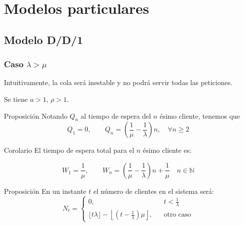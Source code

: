 \documentclass[8pt]{beamer}
\begin{document}
  
  
\section{Modelos particulares}

  \subsection{Modelo D/D/1}
  \begin{frame}\frametitle{Caso $\lambda > \mu$}
    Intuitivamente, la cola será inestable y no podrá servir todas las peticiones. 

    Se tiene $a > 1$, $\rho > 1$.

    \begin{block}{Proposición}
      Notando $Q_n$ al tiempo de espera del $n$ ésimo cliente, tenemos que \[Q_1 = 0, \qquad Q_n = \left(\frac{1}{\mu} - \frac{1}{\lambda}\right)n, \quad \forall n\ge 2\]
    \end{block}

    \begin{block}{Corolario}
      El tiempo de espera total para el $n$ ésimo cliente es:
 
      \[W_1 = \frac{1}{\mu}, \qquad W_n = \left(\frac{1}{\mu} - \frac{1}{\lambda}\right)n + \frac{1}{\mu} \quad n\in \mathbb{N}\]
    \end{block}

    \begin{block}{Proposición}
      En un instante $t$ el número de clientes en el sistema será: 
      \[N_t = \left\{\begin{array}{lcc}
      0, && t < \frac{1}{\lambda}\\
      \lfloor t\lambda \rfloor - \left\lfloor\left(t-\frac{1}{\lambda}\right)\mu\right\rfloor, && \text{otro caso}
      \end{array}\right.\]
    \end{block}

  \end{frame}
\end{document}
